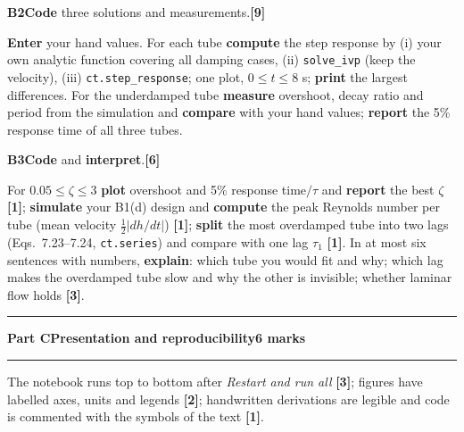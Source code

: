 \documentclass[10pt,a4paper]{article}
\newcommand{\code}[1]{\texttt{#1}}
\newcommand{\cv}[1]{\textbf{#1}}   %
\newcommand{\mk}[1]{\textbf{[#1]}}
\newcommand{\qhead}[3]{\textbf{#1}\enspace #2\hfill\mk{#3}\par\vspace{1pt}}
\newcommand{\examsection}[3]{%
  \par\vspace{6pt}
  \noindent\rule{\linewidth}{1.4pt}\par\vspace{2pt}
  {\large\bfseries Part #1\quad #2}\hfill {\small\textbf{#3 marks}}\par
  \vspace{1pt}\noindent\rule{\linewidth}{0.4pt}\par\vspace{3pt}}
\newlength{\qgap}\setlength{\qgap}{4pt}
\newenvironment{qblock}{\par\noindent\begin{minipage}{\linewidth}\small}{\end{minipage}\par\vspace{\qgap}}
\begin{document}
\begin{qblock}
\qhead{B2}{\cv{Code} three solutions and measurements.}{9}
\cv{Enter} your hand values. For each tube \cv{compute} the step response by (i) your own analytic function covering all damping cases, (ii) \code{solve\_ivp} (keep the velocity), (iii) \code{ct.step\_response}; one plot, $0\le t\le8$ s; \cv{print} the largest differences. For the underdamped tube \cv{measure} overshoot, decay ratio and period from the simulation and \cv{compare} with your hand values; \cv{report} the 5\% response time of all three tubes.
\end{qblock}

\begin{qblock}
\qhead{B3}{\cv{Code} and \cv{interpret}.}{6}
For $0.05\le\zeta\le3$ \cv{plot} overshoot and 5\% response time$/\tau$ and \cv{report} the best $\zeta$ \mk{1}; \cv{simulate} your B1(d) design and \cv{compute} the peak Reynolds number per tube (mean velocity $\tfrac12|dh/dt|$) \mk{1}; \cv{split} the most overdamped tube into two lags (Eqs.\ 7.23--7.24, \code{ct.series}) and compare with one lag $\tau_1$ \mk{1}. In at most six sentences with numbers, \cv{explain}: which tube you would fit and why; which lag makes the overdamped tube slow and why the other is invisible; whether laminar flow holds \mk{3}.
\end{qblock}

\examsection{C}{Presentation and reproducibility}{6}
{\small The notebook runs top to bottom after \emph{Restart and run all} \mk{3}; figures have labelled axes, units and legends \mk{2}; handwritten derivations are legible and code is commented with the symbols of the text \mk{1}.}
\end{document}
